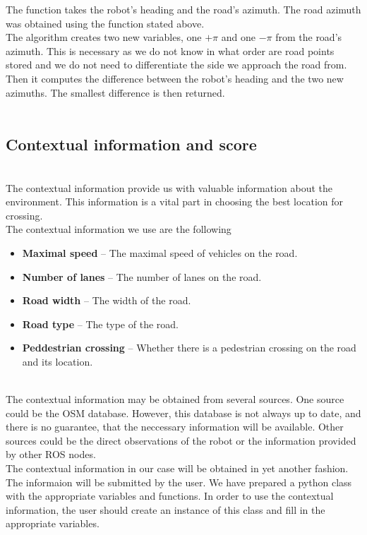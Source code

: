             The function takes the robot's heading and the road's azimuth. The road azimuth was obtained using the function stated above.\\
            The algorithm creates two new variables, one $+\pi$ and one $-\pi$ from the road's azimuth. This is necessary as we do not know in what order are road points stored and we do not need to differentiate the side we approach the road from.\\
            Then it computes the difference between the robot's heading and the two new azimuths. The smallest difference is then returned.\\\\
    
    \subsection{Contextual information and score}
    \label{sec:context}
        \\
            The contextual information provide us with valuable information about the environment. This information is a vital part in choosing the best location for crossing.\\
            The contextual information we use are the following
            \begin{itemize}
                \item \textbf{Maximal speed} -- The maximal speed of vehicles on the road.
                \item \textbf{Number of lanes} -- The number of lanes on the road.
                \item \textbf{Road width} -- The width of the road.
                \item \textbf{Road type} -- The type of the road.
                \item \textbf{Peddestrian crossing} -- Whether there is a pedestrian crossing on the road and its location.
            \end{itemize}
        \\
            The contextual information may be obtained from several sources. One source could be the OSM database. However, this database is not always up to date, and there is no guarantee, that the neccessary information will be available. Other sources could be the direct observations of the robot or the information provided by other ROS nodes.\\
            The contextual information in our case will be obtained in yet another fashion. The informaion will be submitted by the user. We have prepared a python class with the appropriate variables and functions. In order to use the contextual information, the user should create an instance of this class and fill in the appropriate variables.\\
